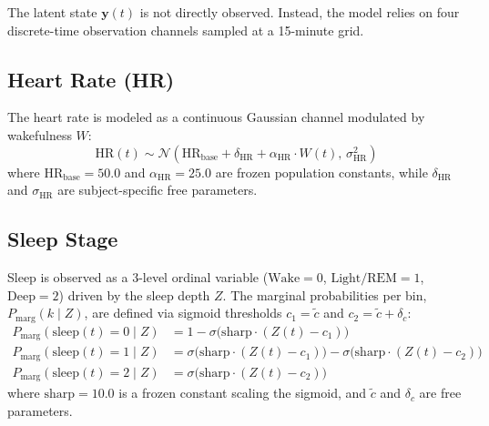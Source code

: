 \documentclass[11pt,a4paper]{article}
\begin{document}
The latent state $\mathbf{y}(t)$ is not directly observed. Instead, the model relies on four discrete-time observation channels sampled at a 15-minute grid.

\subsection{Heart Rate (HR)}
The heart rate is modeled as a continuous Gaussian channel modulated by wakefulness $W$:
\[
\text{HR}(t) \sim \mathcal{N}\left(\text{HR}_{\text{base}} + \delta_{\text{HR}} + \alpha_{\text{HR}} \cdot W(t), \, \sigma_{\text{HR}}^2\right)
\]
where $\text{HR}_{\text{base}} = 50.0$ and $\alpha_{\text{HR}} = 25.0$ are frozen population constants, while $\delta_{\text{HR}}$ and $\sigma_{\text{HR}}$ are subject-specific free parameters.

\subsection{Sleep Stage}
Sleep is observed as a 3-level ordinal variable ($\text{Wake} = 0$, $\text{Light/REM} = 1$, $\text{Deep} = 2$) driven by the sleep depth $Z$. The marginal probabilities per bin, $P_{\text{marg}}(k \mid Z)$, are defined via sigmoid thresholds $c_1 = \tilde{c}$ and $c_2 = \tilde{c} + \delta_c$:
\begin{align*}
P_{\text{marg}}(\text{sleep}(t) = 0 \mid Z) &= 1 - \sigma\big(\text{sharp} \cdot (Z(t) - c_1)\big) \\
P_{\text{marg}}(\text{sleep}(t) = 1 \mid Z) &= \sigma\big(\text{sharp} \cdot (Z(t) - c_1)\big) - \sigma\big(\text{sharp} \cdot (Z(t) - c_2)\big) \\
P_{\text{marg}}(\text{sleep}(t) = 2 \mid Z) &= \sigma\big(\text{sharp} \cdot (Z(t) - c_2)\big)
\end{align*}
where $\text{sharp} = 10.0$ is a frozen constant scaling the sigmoid, and $\tilde{c}$ and $\delta_c$ are free parameters. 
\end{document}
